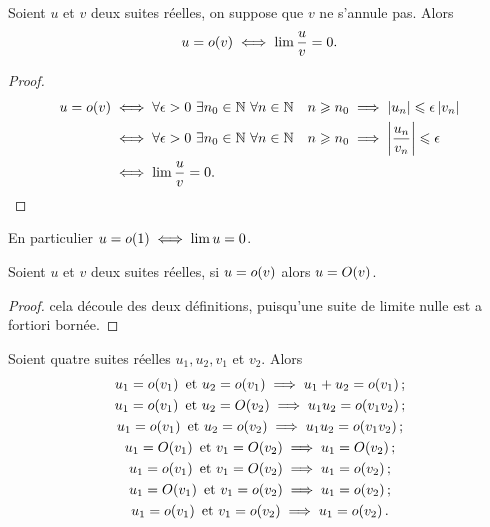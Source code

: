 \begin{prop}
  Soient $u$ et $v$ deux suites réelles, on suppose que $v$ ne s'annule pas. Alors
  \begin{equation}
    u=o\mathopen{}\left(v\right) \iff \lim \frac{u}{v}=0.
  \end{equation}
\end{prop}
\begin{proof}
  \begin{align}
    u=o\mathopen{}\left(v\right) & \iff \forall \epsilon > 0 \ \exists n_0 \in \mathbb{N} \ \forall n \in \mathbb{N} \quad n \geqslant n_0 \implies \left\lvert u_n\right\rvert \leqslant \epsilon \left\lvert v_n\right\rvert \\
    & \iff \forall \epsilon > 0 \ \exists n_0 \in \mathbb{N} \ \forall n \in \mathbb{N} \quad n \geqslant n_0 \implies \left\lvert\frac{u_n}{v_n}\right\rvert \leqslant \epsilon \\
    & \iff \lim \frac{u}{v} =0.
  \end{align}
\end{proof}
En particulier $u=o\mathopen{}\left(1\right) \iff \lim u =0$.
\begin{prop}
  Soient $u$ et $v$ deux suites réelles, si $u=o\mathopen{}\left(v\right)$ alors $u=O\mathopen{}\left(v\right)$.
\end{prop}
\begin{proof}
  cela découle des deux définitions, puisqu'une suite de limite nulle est a fortiori bornée.
\end{proof}
\begin{prop}
  Soient quatre suites réelles $u_1, u_2, v_1$ et $v_2$. Alors
  \begin{gather}
    u_1=o\mathopen{}\left(v_1\right)\text{~et~}u_2=o\mathopen{}\left(v_1\right)\implies u_1+u_2=o\mathopen{}\left(v_1\right);\\
    u_1=o\mathopen{}\left(v_1\right)\text{~et~}u_2=O\mathopen{}\left(v_2\right)\implies u_1u_2=o\mathopen{}\left(v_1 v_2\right);\\
    u_1=o\mathopen{}\left(v_1\right)\text{~et~}u_2=o\mathopen{}\left(v_2\right)\implies u_1u_2=o\mathopen{}\left(v_1 v_2\right);\\
    u_1=O\mathopen{}\left(v_1\right)\text{~et~}v_1=O\mathopen{}\left(v_2\right)\implies u_1=O\mathopen{}\left(v_2\right);\\
    u_1=o\mathopen{}\left(v_1\right)\text{~et~}v_1=O\mathopen{}\left(v_2\right)\implies u_1=o\mathopen{}\left(v_2\right);\\
    u_1=O\mathopen{}\left(v_1\right)\text{~et~}v_1=o\mathopen{}\left(v_2\right)\implies u_1=o\mathopen{}\left(v_2\right);\\
    u_1=o\mathopen{}\left(v_1\right)\text{~et~}v_1=o\mathopen{}\left(v_2\right)\implies u_1=o\mathopen{}\left(v_2\right).
  \end{gather}
\end{prop}
